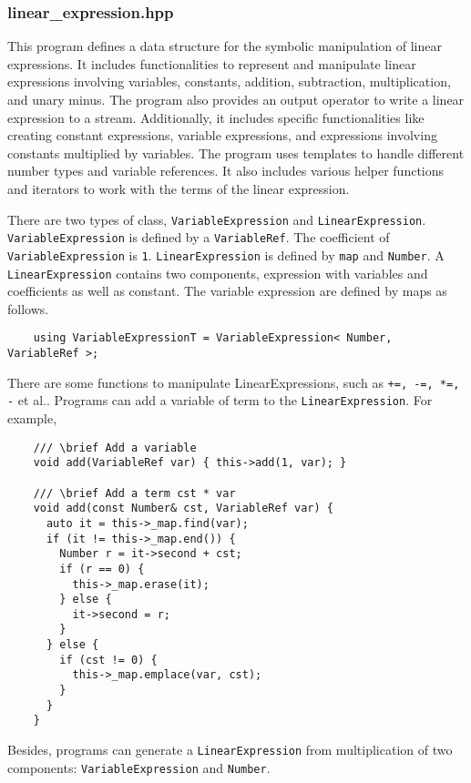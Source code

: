 \documentclass[12pt]{article}
\begin{document}
\subsubsection{linear\_expression.hpp}
This program defines a data structure for the symbolic manipulation of linear expressions. It includes functionalities to represent and manipulate linear expressions involving variables, constants, addition, subtraction, multiplication, and unary minus. The program also provides an output operator to write a linear expression to a stream. Additionally, it includes specific functionalities like creating constant expressions, variable expressions, and expressions involving constants multiplied by variables. The program uses templates to handle different number types and variable references. It also includes various helper functions and iterators to work with the terms of the linear expression.

There are two types of class, \texttt{VariableExpression} and \texttt{LinearExpression}. \texttt{VariableExpression} is defined by a \texttt{VariableRef}. The coefficient of \texttt{VariableExpression} is \texttt{1}. \texttt{LinearExpression} is defined by \texttt{map} and \texttt{Number}. A \texttt{LinearExpression} contains two components, expression with variables and coefficients as well as constant. The variable expression are defined by maps as follows.
\begin{lstlisting}
    using VariableExpressionT = VariableExpression< Number, VariableRef >;
\end{lstlisting}

There are some functions to manipulate LinearExpressions, such as \texttt{+=, -=, *=, -} et al.. Programs can add a variable of term to the \texttt{LinearExpression}. For example,
\begin{lstlisting}
    /// \brief Add a variable
    void add(VariableRef var) { this->add(1, var); }
  
    /// \brief Add a term cst * var
    void add(const Number& cst, VariableRef var) {
      auto it = this->_map.find(var);
      if (it != this->_map.end()) {
        Number r = it->second + cst;
        if (r == 0) {
          this->_map.erase(it);
        } else {
          it->second = r;
        }
      } else {
        if (cst != 0) {
          this->_map.emplace(var, cst);
        }
      }
    }
\end{lstlisting}

Besides, programs can generate a \texttt{LinearExpression} from multiplication of two components: \texttt{VariableExpression} and \texttt{Number}.
\end{document}
